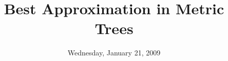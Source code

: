 \documentclass{colloqflyer}
\title{Best Approximation in Metric Trees}
\date{Wednesday, January 21, 2009}
\begin{document}
\flyer{}                        %
\end{document}
